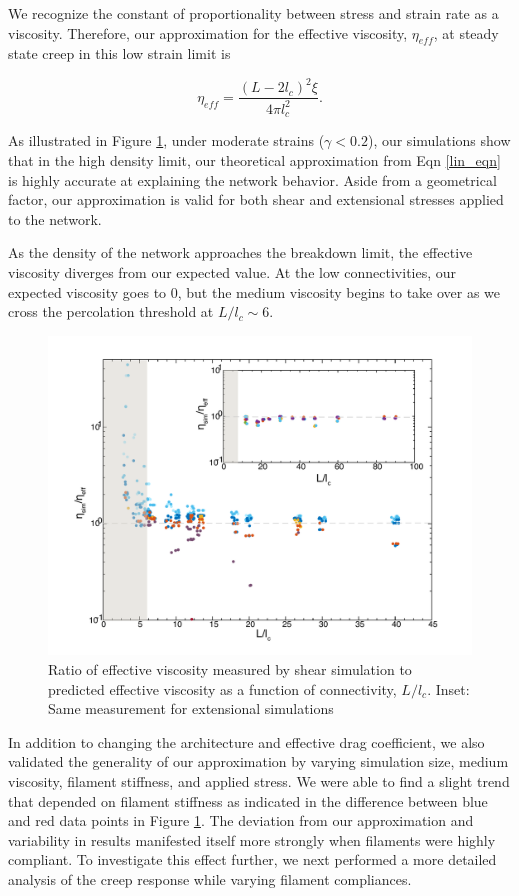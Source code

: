 \documentclass[pre,preprint]{revtex4-1}
\begin{document}
We recognize the constant of proportionality between stress and strain rate as a viscosity.  Therefore, our approximation for the effective viscosity, $\eta_{eff}$, at steady state creep in this low strain limit is

\begin{equation}
\label{lin_eqn}
\eta_{eff} = \frac{(L-2l_c)^2 \xi}{4\pi l_c^2} .
\end{equation}

As illustrated in Figure \ref{fig:effvic}, under moderate strains ($\gamma<0.2$), our  simulations show that in the high density limit, our theoretical approximation from Eqn \ref{lin_eqn} is highly accurate at explaining the network behavior.  Aside from a geometrical factor, our approximation is valid for both shear and extensional stresses applied to the network.

As the density of the network approaches the breakdown limit, the effective viscosity diverges from our expected value.  At the low connectivities, our expected viscosity goes to 0, but the medium viscosity begins to take over as we cross the percolation threshold at $L/l_c \sim 6$.  
\begin{figure}[h!]
\centering
\includegraphics[width=\hsize]{eff_vic_master}
\caption{\label{fig:effvic}Ratio of effective viscosity measured by shear simulation to predicted effective viscosity as a function of connectivity, $L/l_c$. Inset: Same measurement for extensional simulations }
\end{figure}

In addition to changing the architecture and effective drag coefficient, we also validated the generality of our approximation by varying simulation size, medium viscosity, filament stiffness, and applied stress.  We were able to find a slight trend that depended on filament stiffness as indicated in the difference between blue and red data points in Figure \ref{fig:effvic}.  The deviation from our approximation and variability in results manifested itself more strongly when filaments were highly compliant.  To investigate this effect further, we next performed a more detailed analysis of the creep response while varying filament compliances.
\end{document}
